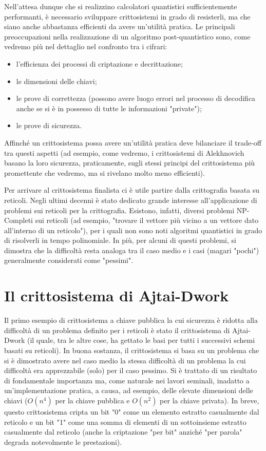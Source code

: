 \documentclass[12pt, a4paper]{report}
\theoremstyle{definition}
\begin{document}
		Nell'attesa dunque che si realizzino calcolatori quantistici sufficientemente performanti, è necessario sviluppare crittosistemi in grado di resisterli, ma che siano anche abbastanza efficienti da avere un'utilità pratica. Le principali preoccupazioni nella realizzazione di un algoritmo post-quantistico sono, come vedremo più nel dettaglio nel confronto tra i cifrari:
		\begin{itemize}
			\item l'efficienza dei processi di criptazione e decrittazione;
			\item le dimensioni delle chiavi;
			\item le prove di correttezza (possono avere luogo errori nel processo di decodifica anche se si è in possesso di tutte le informazioni "private");
			\item le prove di sicurezza.
		\end{itemize}
		Affinché un crittosistema possa avere un'utilità pratica deve bilanciare il trade-off tra questi aspetti (ad esempio, come vedremo, i crittosistemi di Alekhnovich basano la loro sicurezza, praticamente, sugli stessi principi del crittosistema più promettente che vedremo, ma si rivelano molto meno efficienti).
		
		Per arrivare al crittosistema finalista ci è utile partire dalla crittografia basata su reticoli. Negli ultimi decenni è stato dedicato grande interesse all'applicazione di problemi sui reticoli per la crittografia. Esistono, infatti, diversi problemi NP-Completi sui reticoli (ad esempio, "trovare il vettore più vicino a un vettore dato all'interno di un reticolo"), per i quali non sono noti algoritmi quantistici in grado di risolverli in tempo polinomiale. In più, per alcuni di questi problemi, si dimostra che la difficoltà resta analoga tra il caso medio e i casi (magari "pochi") generalmente considerati come "pessimi".
		\section{Il crittosistema di Ajtai-Dwork \cite{18}}
			Il primo esempio di crittosistema a chiave pubblica la cui sicurezza è ridotta alla difficoltà di un problema definito per i reticoli è stato il crittosistema di Ajtai-Dwork (il quale, tra le altre cose, ha gettato le basi per tutti i successivi schemi basati su reticoli). In buona sostanza, il crittosistema si basa su un problema che si è dimostrato avere nel caso medio la stessa difficoltà di un problema la cui difficoltà era apprezzabile (solo) per il caso pessimo. Si è trattato di un risultato di fondamentale importanza ma, come naturale nei lavori seminali, inadatto a un'implementazione pratica, a causa, ad esempio, delle elevate dimensioni delle chiavi ($O(n^4)$ per la chiave pubblica e $O(n^2)$ per la chiave privata).
			In breve, questo crittosistema cripta un bit "0" come un elemento estratto casualmente dal reticolo e un bit "1" come una somma di elementi di un sottoinsieme estratto casualmente dal reticolo (anche la criptazione "per bit" anziché "per parola" degrada notevolmente le prestazioni).
\end{document}
